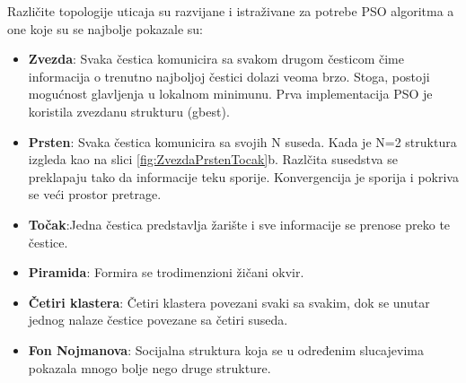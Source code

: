 \documentclass[a4paper]{article}
\begin{document}
Različite topologije uticaja su razvijane i istraživane za potrebe PSO algoritma a one koje su se najbolje pokazale su:
\begin{itemize}
    \item \textbf{Zvezda}: Svaka čestica komunicira sa svakom drugom česticom čime informacija o trenutno najboljoj čestici dolazi veoma brzo. Stoga, postoji mogućnost glavljenja u lokalnom minimunu. Prva implementacija PSO je koristila zvezdanu strukturu (gbest).
    \item \textbf{Prsten}: Svaka čestica komunicira sa svojih N suseda. Kada je N=2 struktura izgleda kao na slici \ref{fig:ZvezdaPrstenTocak}b. Razlčita susedstva se preklapaju tako da informacije teku sporije. Konvergencija je sporija i pokriva se veći prostor pretrage.
    \item \textbf{Točak}:Jedna čestica predstavlja žarište i sve informacije se prenose preko te čestice.
    \item \textbf{Piramida}: Formira se trodimenzioni žičani okvir.
    \item \textbf{Četiri klastera}: Četiri klastera povezani svaki sa svakim, dok se unutar jednog nalaze čestice povezane sa četiri suseda.
    \item \textbf{Fon Nojmanova}: Socijalna struktura koja se u određenim slucajevima pokazala mnogo bolje nego druge strukture.
\end{itemize}
\end{document}
